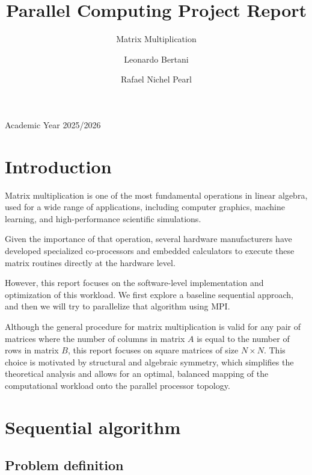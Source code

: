 \documentclass[
  12pt,
]{article}
\title{Parallel Computing Project Report}
\subtitle{Matrix Multiplication}
\author{Leonardo Bertani \and Rafael Nichel Pearl}
\date{}
\begin{document}
\maketitle


\begin{center}
  Academic Year 2025/2026
  \vspace{1em}
\end{center}

\section{Introduction}\label{introduction}

Matrix multiplication is one of the most fundamental operations in
linear algebra, used for a wide range of applications, including
computer graphics, machine learning, and high-performance scientific
simulations.

Given the importance of that operation, several hardware manufacturers
have developed specialized co-processors and embedded calculators to
execute these matrix routines directly at the hardware level.

However, this report focuses on the software-level implementation and
optimization of this workload. We first explore a baseline sequential
approach, and then we will try to parallelize that algorithm using MPI.

\begin{tcolorbox}[enhanced jigsaw, left=2mm, colback=white, breakable, colframe=quarto-callout-note-color-frame, arc=.35mm, bottomrule=.15mm, rightrule=.15mm, toprule=.15mm, opacityback=0, leftrule=.75mm]

Although the general procedure for matrix multiplication is valid for
any pair of matrices where the number of columns in matrix \(A\) is
equal to the number of rows in matrix \(B\), this report focuses on
square matrices of size \(N \times N\). This choice is motivated by
structural and algebraic symmetry, which simplifies the theoretical
analysis and allows for an optimal, balanced mapping of the
computational workload onto the parallel processor topology.

\end{tcolorbox}

\section{Sequential algorithm}\label{sequential-algorithm}

\subsection{Problem definition}\label{problem-definition}
\end{document}
